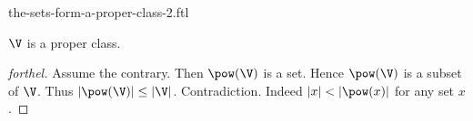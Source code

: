 \documentclass{naproche-library}
\begin{document}
\begin{smodule}[title=The Sets Form a Proper Class -- Cantor's Second Paradox]{the-sets-form-a-proper-class-2.ftl}

\begin{theorem*}[forthel,title=Cantor's Second Paradox,id=cantor_paradox_2]
  $\V$ is a proper class.
\end{theorem*}
\begin{proof}[forthel]
  Assume the contrary.
  Then $\pow(\V)$ is a set.
  Hence $\pow(\V)$ is a subset of $\V$.
  Thus $|\pow(\V)| \leq |\V|$.
  Contradiction.
  Indeed $|x| < |\pow(x)|$ for any set $x$.
\end{proof}
\end{smodule}
\end{document}
